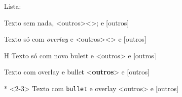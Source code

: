 \documentclass[10pt]{beamer}
\begin{document}


\begin{frame}
    \footnotesize
    Lista:\bigskip

    \begin{itemizex}
        \item Texto sem nada, <outros><>; e [outros]
        \item <2-> Texto só com \textit{overlay} e <outros><> e [outros]
        \item [H] Texto só com novo bulett e <outros> e [outros]
        \item <2-3>[*] Texto com overlay e bullet <\textbf{outros}> e [outros]
        \item [*]<2-3> Texto com \texttt{bullet} e overlay <outros> e [outros]
    \end{itemizex}

\end{frame}
\end{document}
